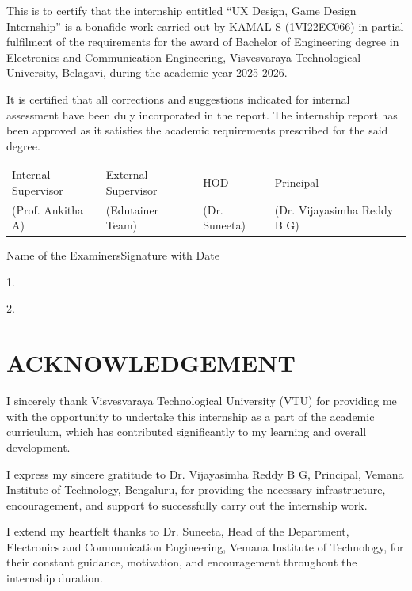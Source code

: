\documentclass[12pt,a4paper]{report}
\begin{document}
This is to certify that the internship entitled ``UX Design, Game Design Internship'' is a bonafide work carried out by KAMAL S (1VI22EC066) in partial fulfilment of the requirements for the award of Bachelor of Engineering degree in Electronics and Communication Engineering, Visvesvaraya Technological University, Belagavi, during the academic year 2025-2026.

It is certified that all corrections and suggestions indicated for internal assessment have been duly incorporated in the report. The internship report has been approved as it satisfies the academic requirements prescribed for the said degree.

\vspace{1cm}
\begin{center}
\begin{tabular}{p{} p{} p{} p{}}
Internal Supervisor & External Supervisor & HOD & Principal \\
(Prof. Ankitha A) & (Edutainer Team) & (Dr. Suneeta) & (Dr. Vijayasimha Reddy B G) \\
\end{tabular}
\end{center}

\vspace{0.8cm}
Name of the Examiners\hfill Signature with Date\par
1.\par
2.\par



\newpage
\chapter*{ACKNOWLEDGEMENT}

I sincerely thank Visvesvaraya Technological University (VTU) for providing me with the opportunity to undertake this internship as a part of the academic curriculum, which has contributed significantly to my learning and overall development.

I express my sincere gratitude to Dr. Vijayasimha Reddy B G, Principal, Vemana Institute of Technology, Bengaluru, for providing the necessary infrastructure, encouragement, and support to successfully carry out the internship work.

I extend my heartfelt thanks to Dr. Suneeta, Head of the Department, Electronics and Communication Engineering, Vemana Institute of Technology, for their constant guidance, motivation, and encouragement throughout the internship duration.
\end{document}
